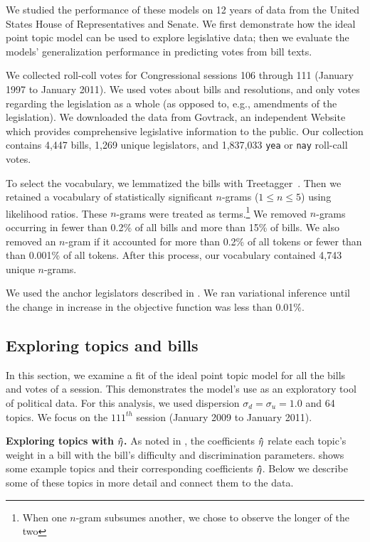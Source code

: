 We studied the performance of these models on 12 years of data from
the United States House of Representatives and Senate.  We first
demonstrate how the ideal point topic model can be used to explore
legislative data; then we evaluate the models' generalization
performance in predicting votes from bill texts.

We collected roll-coll votes for Congressional sessions 106 through
111 (January 1997 to January 2011).  We used votes about bills and
resolutions, and only votes regarding the legislation as a whole
(as opposed to, e.g., amendments of the legislation). We downloaded
the data from Govtrack, an independent Website which provides
comprehensive legislative information to the public.  Our
collection contains 4,447 bills, 1,269 unique legislators, and
1,837,033 \verb!yea! or \verb!nay! roll-call votes.

To select the vocabulary, we lemmatized the bills with
Treetagger~\cite{treetagger}.  Then we retained a vocabulary of
statistically significant $n$-grams ($1 \le n \le 5$) using likelihood
ratios.  These $n$-grams were treated as terms.\footnote{When one
  $n$-gram subsumes another, we chose to observe the longer of the
  two}  We removed $n$-grams occurring in fewer than 0.2\% of all
bills and more than 15\% of bills.  We also removed an
$n$-gram if it accounted for more than 0.2\% of all tokens or fewer
than than 0.001\% of all tokens.  After this process, our vocabulary
contained 4,743 unique $n$-grams.

We used the anchor legislators described in .  We ran
variational inference until the change in increase in the objective
function was less than 0.01\%.

\subsection{Exploring topics and bills}

In this section, we examine a fit of the ideal point topic model for
all the bills and votes of a session.  This demonstrates the model's
use as an exploratory tool of political data.  For this analysis, we
used dispersion $\sigma_d = \sigma_u = 1.0$ and 64 topics.  We focus
on the $111^{th}$ session (January 2009 to January 2011).

\textbf{Exploring topics with $\bm \hat \eta$.} As noted in , the
coefficients $\bm \hat \eta$ relate each topic's weight in a bill with the
bill's difficulty and discrimination parameters.  shows
some example topics and their corresponding coefficients $\bm \hat \eta$.  Below
we describe some of these topics in more detail and connect them to
the data.

